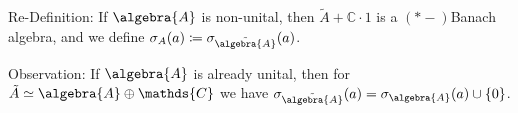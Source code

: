 \documentclass[a4paper]{article}
\begin{document}




\begin{definition}
	Re-Definition: If $\algebra{A}$ is non-unital, then $\tilde{A} + \mathds{C} \cdot 1$ is a $(*-)$Banach algebra, and we define $\sigma_A(a) \coloneq \sigma_{\tilde{\algebra{A}}}(a)$.
\end{definition}

Observation: If $\algebra{A}$ is already unital, then for $\tilde{A} \simeq \algebra{A} \oplus \mathds{C}$ we have $\sigma_{\tilde{\algebra{A}}}(a) = \sigma_\algebra{A}(a) \cup \{ 0\}$.
\end{document}
